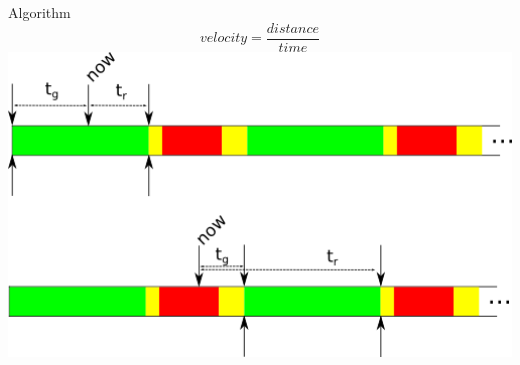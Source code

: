 \begin{frame}{Algorithm}
\[velocity = \frac{distance}{time}\]
\includegraphics[width=1\textwidth]{images/algphases.png}
\end{frame}







